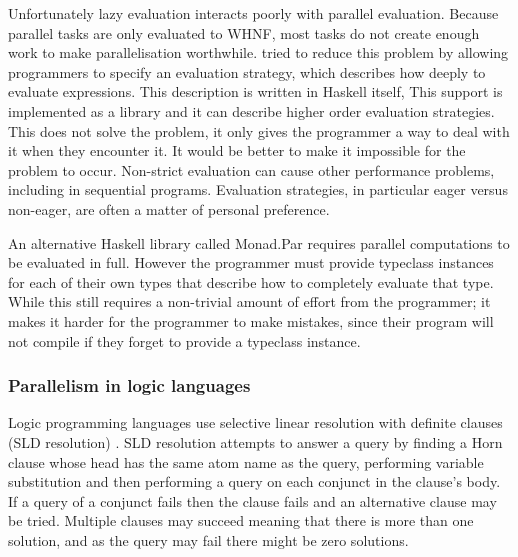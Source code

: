 Unfortunately lazy evaluation interacts poorly with
parallel evaluation.
Because parallel tasks are only evaluated to WHNF,
most tasks do not create enough work to make parallelisation worthwhile.
\citet{trinder:98:strategies}
tried to reduce this problem by allowing programmers to
specify an evaluation strategy,
which describes how deeply to evaluate expressions.
This description is written in Haskell itself,
This support is implemented as a library and it can describe higher order
evaluation strategies.
This does not solve the problem,
it only gives the programmer a way to deal with it when they encounter it.
It would be better to make it impossible for the problem to occur.
Non-strict evaluation can cause other performance problems,
including in sequential programs.
Evaluation strategies, in particular eager versus non-eager,
are often a matter of personal preference.

An alternative Haskell library called Monad.Par \citep{marlow:monadpar}
requires parallel computations to be evaluated in full.
However the programmer must provide typeclass instances for each of their
own types that describe how to completely evaluate that type.
While this still requires a non-trivial amount of effort from the
programmer;
it makes it harder for the programmer to make mistakes,
since their program will not compile if they forget to provide a typeclass
instance.

\subsubsection{Parallelism in logic languages}
\label{sec:intro_par_logic}

Logic programming languages use selective linear resolution with definite
clauses (SLD resolution) \citep{kowalski_sld}.
SLD resolution attempts to answer a query by finding a Horn clause whose
head has the same atom name as the query,
performing variable substitution and then performing a query on each
conjunct in the clause's body.
If a query of a conjunct fails then the clause fails and an alternative
clause may be tried.
Multiple clauses may succeed meaning that there is more than one solution,
and as the query may fail there might be zero solutions.

